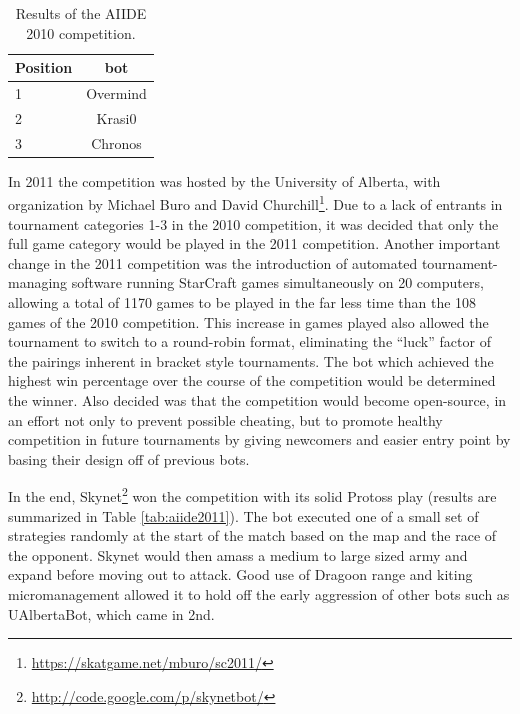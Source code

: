 \documentclass[journal]{IEEEtran}
\begin{document}
\begin{table}[bth]
\caption{Results of the AIIDE 2010 competition.}
\label{tab:aiide2010}
\begin{small}
\begin{center}
\begin{tabular}{|l|c|}
\hline
Position & bot\\ \hline
1 & Overmind \\
2 & Krasi0 \\
3 & Chronos \\ \hline
\end{tabular}
\end{center}
\end{small}
\end{table}


In 2011 the competition was hosted by the University of Alberta, with organization by Michael Buro and
David Churchill\footnote{\url{https://skatgame.net/mburo/sc2011/}}. Due to a lack of entrants in tournament categories 1-3 in the 2010 competition, it was
decided that only the full game category would be played in the 2011 competition. Another important
change in the 2011 competition was the introduction of automated tournament-managing software running
StarCraft games simultaneously on 20 computers, allowing a total of 1170 games to be played in the far less
time than the 108 games of the 2010 competition. This increase in games played also allowed the tournament
to switch to a round-robin format, eliminating the ``luck'' factor of the pairings inherent in bracket
style tournaments. The bot which achieved the highest win percentage over the course of the competition would
be determined the winner. Also decided was that the competition would become open-source, in an effort not
only to prevent possible cheating, but to promote healthy competition in future tournaments by giving
newcomers and easier entry point by basing their design off of previous bots.

In the end, Skynet\footnote{\url{http://code.google.com/p/skynetbot/}} won the competition with its solid Protoss play (results are summarized in Table \ref{tab:aiide2011}). The bot executed one of a small set of
strategies randomly at the start of the match based on the map and the race of the opponent. Skynet would
then amass a medium to large sized army and expand before moving out to attack. Good use of Dragoon range
and kiting micromanagement allowed it to hold off the early aggression of other bots such as UAlbertaBot,
which came in 2nd. 
\end{document}
